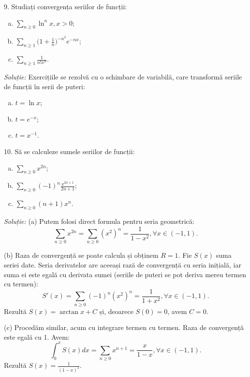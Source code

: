 \documentclass[11pt,a4paper]{article}
\newcommand\ds{\displaystyle}
\theoremstyle{dotless}
\theoremstyle{dotlessdr}
\begin{document}
\vspace{1cm}

9. Studiați convergența seriilor de funcții:
\begin{enumerate}[(a)]
\item $\ds\sum_{n \geq 0} \ln^n x, x > 0$;
\item $\ds\sum_{n \geq 1} \Big( 1 + \frac{1}{n} \Big)^{-n^2} e^{-nx}$;
\item $\ds\sum_{n \geq 1} \frac{1}{n! x^n}$.
\end{enumerate}

\emph{Soluție:} Exercițiile se rezolvă cu o schimbare de variabilă, care
transformă seriile de funcții în serii de puteri:
\begin{enumerate}[(a)]
\item $t = \ln x$;
\item $t = e^{-x}$;
\item $t = x^{-1}$.
\end{enumerate}

\vspace{1cm}

10. Să se calculeze sumele seriilor de funcții:
\begin{enumerate}[(a)]
\item $\ds\sum_{n \geq 0} x^{2n}$;
\item $\ds\sum_{n \geq 0} (-1)^n \frac{x^{2n + 1}}{2n + 1}$;
\item $\ds\sum_{n \geq 0} (n + 1)x^n$.
\end{enumerate}

\emph{Soluție:} (a) Putem folosi direct formula pentru seria geometrică:
\[
  \sum_{n \geq 0} x^{2n} = \sum_{n \geq 0} (x^2)^n = \frac{1}{1 - x^2}, %
  \forall x \in (-1, 1).
\]

(b) Raza de convergență se poate calcula și obținem $R = 1$. Fie $S(x)$ suma seriei
date. Seria derivatelor are aceeași rază de convergență cu seria inițială, iar
suma ei este egală cu derivata sumei (seriile de puteri se pot deriva mereu termen
cu termen):
\[
  S'(x) = \sum_{n \geq 0} (-1)^n (x^2)^n = \frac{1}{1 + x^2}, \forall x \in (-1, 1).
\]
Rezultă $S(x) = \arctan x + C$ și, deoarece $S(0) = 0$, avem $C = 0$.

(c) Procedăm similar, acum cu integrare termen cu termen. Raza de convergență
este egală cu 1. Avem:
\[
  \int_0^x S(x) dx = \sum_{n \geq 0} x^{n + 1} = \frac{x}{1 - x}, \forall x \in (-1, 1).
\]
Rezultă $S(x) = \frac{1}{(1 - x)^2}$.

\end{document}
